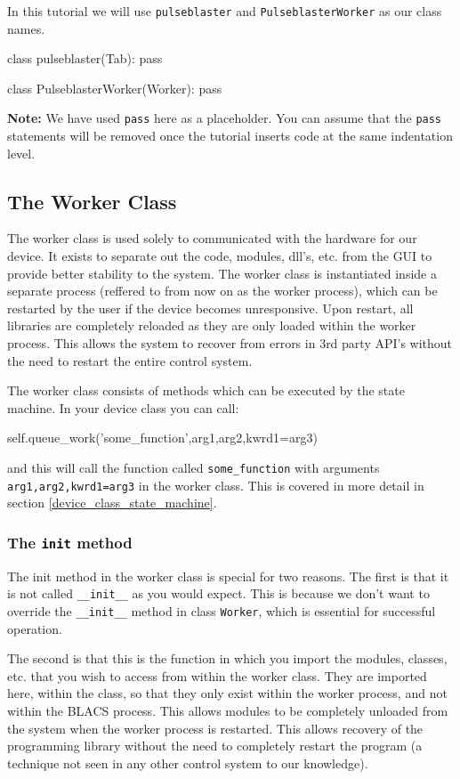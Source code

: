 \documentclass[12pt]{article}
\begin{document}
In this tutorial we will use \texttt{pulseblaster} and \texttt{PulseblasterWorker} as our class names. 

\begin{python}
class pulseblaster(Tab):
    pass
	
class PulseblasterWorker(Worker):
    pass
\end{python}

\textbf{Note:} We have used \texttt{pass} here as a placeholder. You can assume that the \texttt{pass} statements will be removed once the tutorial inserts code at the same indentation level.
\newpage
\subsection{The Worker Class}
The worker class is used solely to communicated with the hardware for our device. It exists to separate out the code, modules, dll's, etc. from the GUI to provide better stability to the system. The worker class is instantiated inside a separate process (reffered to from now on as the worker process), which can be restarted by the user if the device becomes unresponsive. Upon restart, all libraries are completely reloaded as they are only loaded within the worker process. This allows the system to recover from errors in 3rd party API's without the need to restart the entire control system.

The worker class consists of methods which can be executed by the state machine. In your device class you can call:
\begin{python}
self.queue_work('some_function',arg1,arg2,kwrd1=arg3)
\end{python}
and this will call the function called \texttt{some\_function} with arguments \texttt{arg1,arg2,kwrd1=arg3} in the worker class. This is covered in more detail in section \ref{device_class_state_machine}.

\subsubsection{The \texttt{init} method}
The init method in the worker class is special for two reasons. The first is that it is not called \texttt{\_\_init\_\_} as you would expect. This is because we don't want to override the \texttt{\_\_init\_\_} method in class \texttt{Worker},  which is essential for successful operation.

The second is that this is the function in which you import the modules, classes, etc. that you wish to access from within the worker class. They are imported here, within the class, so that they only exist within the worker process, and not within the BLACS process. This allows modules to be completely unloaded from the system when the worker process is restarted. This allows recovery of the programming library without the need to completely restart the program (a technique not seen in any other control system to our knowledge).
\end{document}
